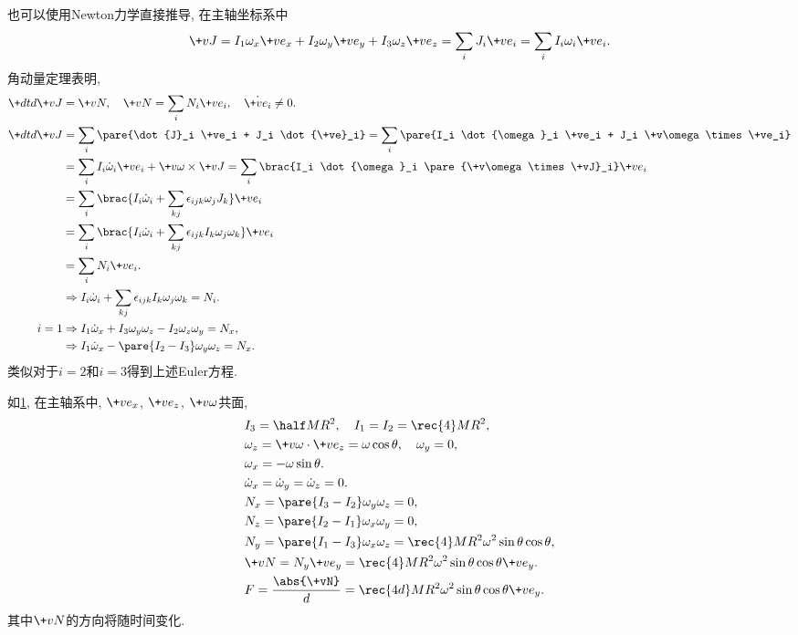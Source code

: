 \documentclass[../LectureNotes.tex]{subfiles}
\begin{document}
也可以使用Newton力学直接推导, 在主轴坐标系中
\[ \+vJ = I_1\omega_x \+ve_x + I_2\omega_y\+ve_y + I_3\omega_z\+ve_z = \sum_i J_i\+ve_i = \sum_i I_i\omega_i\+ve_i. \]
角动量定理表明,
\begin{align*}
    \+dtd{\+vJ} &= \+vN,\quad \+vN = \sum_i N_i \+ve_i,\quad \dot{\+ve_i}\neq 0. \\
    \+dtd{\+vJ} &= \sum_i \pare{\dot{J}_i \+ve_i + J_i \dot{\+ve}_i} = \sum_i \pare{I_i \dot{\omega}_i \+ve_i + J_i \+v\omega\times\+ve_i}\\ &= \sum_i I_i\dot\omega_i\+ve_i + \+v\omega\times\+vJ = \sum_i \brac{I_i \dot{\omega}_i \pare{\+v\omega\times\+vJ}_i}\+ve_i \\
    &= \sum_i \brac{I_i \dot\omega_i + \sum_{kj}\epsilon_{ijk}\omega_j J_k}\+ve_i \\
    &= \sum_i \brac{I_i\dot\omega_i + \sum_{kj}\epsilon_{ijk}I_k\omega_j\omega_k}\+ve_i \\
    &= \sum_i N_i \+ve_i. \\
    & \Rightarrow I_i \dot\omega_i + \sum_{kj}\epsilon_{ijk}I_k\omega_j\omega_k = N_i. \\
    i=1 & \Rightarrow I_1\dot\omega_x + I_3\omega_y\omega_z - I_2\omega_z\omega_y = N_x, \\
    &\Rightarrow I_1\dot{\omega}_x - \pare{I_2 - I_3}\omega_y\omega_z = N_x.
\end{align*}
类似对于$i=2$和$i=3$得到上述Euler方程.
\begin{figure}[ht]
    \centering
    \caption{}
    \label{fig:求力矩}
\end{figure}
\begin{sample}
    \begin{ex}
        如\cref{fig:求力矩}, 在主轴系中, $\+ve_x$, $\+ve_z$, $\+v\omega$共面,
        \begin{align*}
            & I_3 = \half MR^2,\quad I_1 = I_2 = \rec{4}MR^2, \\
            & \omega_z = \+v\omega\cdot\+ve_z = \omega\cos\theta,\quad \omega_y = 0, \\
            & \omega_x = -\omega\sin\theta. \\
            & \dot\omega_x = \dot\omega_y = \dot\omega_z = 0. \\
            & N_x = \pare{I_3 - I_2}\omega_y\omega_z = 0, \\
            & N_z = \pare{I_2 - I_1}\omega_x\omega_y = 0, \\
            & N_y = \pare{I_1 - I_3}\omega_x\omega_z = \rec{4}MR^2\omega^2 \sin\theta\cos\theta, \\
            &\+vN = N_y\+ve_y = \rec{4}MR^2\omega^2\sin\theta\cos\theta\+ve_y. \\
            & F = \frac{\abs{\+vN}}{d} = \rec{4d}MR^2 \omega^2\sin\theta\cos\theta\+ve_y.
        \end{align*}
        其中$\+vN$的方向将随时间变化.
    \end{ex}
\end{sample}
\end{document}
